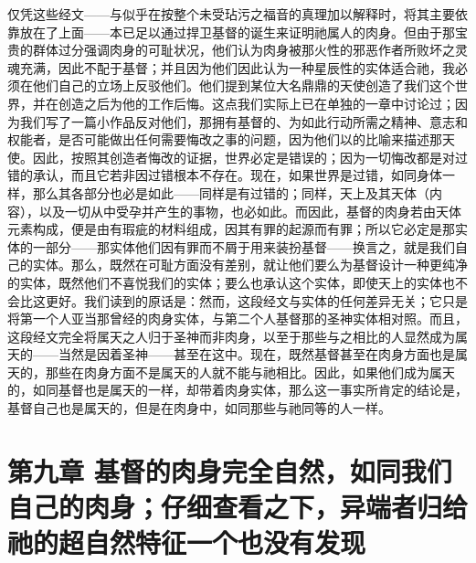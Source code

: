 仅凭这些经文——与似乎在按整个未受玷污之福音的真理加以解释时，将其主要依靠放在了上面——本已足以通过捍卫基督的诞生来证明祂属人的肉身。但由于那宝贵的群体过分强调肉身的可耻状况，他们认为肉身被那火性的邪恶作者所败坏之灵魂充满，因此不配于基督；并且因为他们因此认为一种星辰性的实体适合祂，我必须在他们自己的立场上反驳他们。他们提到某位大名鼎鼎的天使创造了我们这个世界，并在创造之后为他的工作后悔。这点我们实际上已在单独的一章中讨论过；因为我们写了一篇小作品反对他们，那拥有基督的、为如此行动所需之精神、意志和权能者，是否可能做出任何需要悔改之事的问题，因为他们以的比喻来描述那天使。因此，按照其创造者悔改的证据，世界必定是错误的；因为一切悔改都是对过错的承认，而且它若非因过错根本不存在。现在，如果世界是过错，如同身体一样，那么其各部分也必是如此——同样是有过错的；同样，天上及其天体（内容），以及一切从中受孕并产生的事物，也必如此。而因此，基督的肉身若由天体元素构成，便是由有瑕疵的材料组成，因其有罪的起源而有罪；所以它必定是那实体的一部分——那实体他们因有罪而不屑于用来装扮基督——换言之，就是我们自己的实体。那么，既然在可耻方面没有差别，就让他们要么为基督设计一种更纯净的实体，既然他们不喜悦我们的实体；要么也承认这个实体，即使天上的实体也不会比这更好。我们读到的原话是：然而，这段经文与实体的任何差异无关；它只是将第一个人亚当那曾经的肉身实体，与第二个人基督那的圣神实体相对照。而且，这段经文完全将属天之人归于圣神而非肉身，以至于那些与之相比的人显然成为属天的——当然是因着圣神——甚至在这中。现在，既然基督甚至在肉身方面也是属天的，那些在肉身方面不是属天的人就不能与祂相比。因此，如果他们成为属天的，如同基督也是属天的一样，却带着肉身实体，那么这一事实所肯定的结论是，基督自己也是属天的，但是在肉身中，如同那些与祂同等的人一样。\par


\section{第九章 基督的肉身完全自然，如同我们自己的肉身；仔细查看之下，异端者归给祂的超自然特征一个也没有发现}


